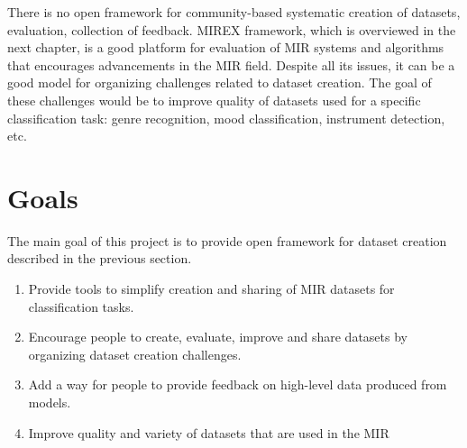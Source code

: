 There is no open framework for community-based systematic creation of datasets, evaluation, collection of feedback. MIREX framework, which is overviewed in the next chapter, is a good platform for evaluation of MIR systems and algorithms that encourages advancements in the MIR field. Despite all its issues, it can be a good model for organizing challenges related to dataset creation. The goal of these challenges would be to improve quality of datasets used for a specific classification task: genre recognition, mood classification, instrument detection, etc.

\section{Goals}

The main goal of this project is to provide open framework for dataset creation described in the previous section.

\begin{enumerate}
    \item Provide tools to simplify creation and sharing of MIR datasets for classification tasks.
    \item Encourage people to create, evaluate, improve and share datasets by organizing dataset creation challenges.
    \item Add a way for people to provide feedback on high-level data produced from models.
    \item Improve quality and variety of datasets that are used in the MIR
\end{enumerate}